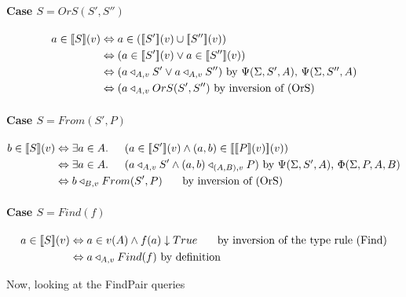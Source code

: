 \documentclass[12pt,a4paper,twoside,openright]{report}
\newcommand{\db}[1]{{\bf [\![}#1{\bf ]\!]}}
\newcommand{\deno}[1]{\db{#1}(v)}
\newcommand{\denoRule}[2]{#1 \in \deno{#2}}
\newcommand{\opRule}[3]{#1 \triangleleft_{#2, v} #3}
\newcommand{\phiRule}[3]{\Phi(\Sigma, #1, #2, #3)}
\newcommand{\psiRule}[2]{\Psi(\Sigma, #1, #2)}
\begin{document}
{{\paragraph{Case $S = OrS(S', S'')$}
\begin{equation} \label{case OrS}
\begin{split}
\denoRule{a}{S} & \Leftrightarrow a \in (\deno{S'} \cup \deno{S''}) \\
				& \Leftrightarrow (\denoRule{a}{S'} \vee \denoRule{a}{S''}) \\
				& \Leftrightarrow (\opRule{a}{A}{S'} \vee \opRule{a}{A}{S''}) \mbox{ by $\psiRule{S'}{A}$, $\psiRule{S''}{A}$}\\
				& \Leftrightarrow (\opRule{a}{A}{OrS(S', S'')} \mbox{ by inversion of (OrS)}
\end{split}
\end{equation}

\paragraph{Case $S = From(S', P)$}
\begin{equation} \label{case From}
\begin{split}
\denoRule{b}{S} & \Leftrightarrow \exists a \in A. \indent (\denoRule{a}{S'} \wedge \denoRule{(a, b)}{\deno{P}}) \\
				& \Leftrightarrow \exists a \in A. \indent (\opRule{a}{A}{S'} \wedge \opRule{(a, b)}{(A, B)}{P}) \mbox{ by $\psiRule{S'}{A}$, $\phiRule{P}{A}{B}$}\\
				& \Leftrightarrow \opRule{b}{B}{From(S', P)} \indent\mbox{ by inversion of (OrS)}
\end{split}
\end{equation}

\paragraph{Case $S = Find(f)$}
\begin{equation} \label{case Find}
\begin{split}
\denoRule{a}{S} & \Leftrightarrow a \in v(A) \wedge f(a) \downarrow True  \indent \mbox{ by inversion of the type rule (Find)}\\
				& \Leftrightarrow \opRule{a}{A}{Find(f)} \mbox{ by definition}\\
\end{split}
\end{equation}

Now, looking at the FindPair queries

}}
\end{document}
